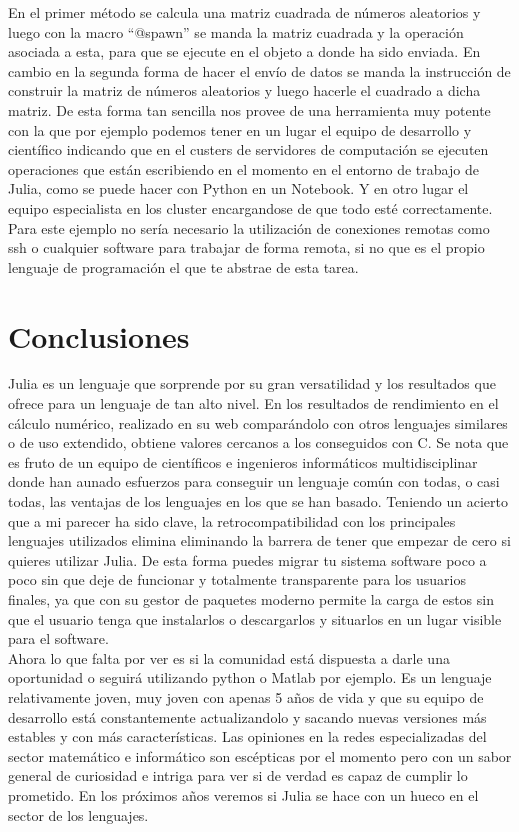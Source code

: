 \documentclass[10pt,a4paper]{article}
\begin{document}
En el primer método se calcula una matriz cuadrada de números aleatorios y luego con la macro ``@spawn'' se manda la matriz cuadrada y la operación asociada a esta, para que se ejecute en el objeto a donde ha sido enviada. En cambio en la segunda forma de hacer el envío de datos se manda la instrucción de construir la matriz de números aleatorios y luego hacerle el cuadrado a dicha matriz. De esta forma tan sencilla nos provee de una herramienta muy potente con la que por ejemplo podemos tener en un lugar el equipo de desarrollo y científico indicando que en el custers de servidores de computación se ejecuten operaciones que están escribiendo en el momento en el entorno de trabajo de Julia, como se puede hacer con Python en un Notebook. Y en otro lugar el equipo especialista en los cluster encargandose de que todo esté correctamente. Para este ejemplo no sería necesario la utilización de conexiones remotas como ssh o cualquier software para trabajar de forma remota, si no que es el propio lenguaje de programación el que te abstrae de esta tarea.

\newpage
\section{Conclusiones}
Julia es un lenguaje que sorprende por su gran versatilidad y los resultados que ofrece para un lenguaje de tan alto nivel. En los resultados de rendimiento en el cálculo numérico, realizado en su web comparándolo con otros lenguajes similares o de uso extendido, obtiene valores cercanos a los conseguidos con C. Se nota que es fruto de un equipo de científicos e ingenieros informáticos multidisciplinar donde han aunado esfuerzos para conseguir un lenguaje común con todas, o casi todas, las ventajas de los lenguajes en los que se han basado. Teniendo un acierto que a mi parecer ha sido clave, la retrocompatibilidad con los principales lenguajes utilizados elimina eliminando la barrera de tener que empezar de cero si quieres utilizar Julia. De esta forma puedes migrar tu sistema software poco a poco sin que deje de funcionar y totalmente transparente para los usuarios finales, ya que con su gestor de paquetes moderno permite la carga de estos sin que el usuario tenga que instalarlos o descargarlos y situarlos en un lugar visible para el software.\\

Ahora lo que falta por ver es si la comunidad está dispuesta a darle una oportunidad o seguirá utilizando python o Matlab por ejemplo. Es un lenguaje relativamente joven, muy joven con apenas 5 años de vida y que su equipo de desarrollo está constantemente actualizandolo y sacando nuevas versiones más estables y con más características. Las opiniones en la redes especializadas del sector matemático e informático son escépticas por el momento pero con un sabor general de curiosidad e intriga para ver si de verdad es capaz de cumplir lo prometido. En los próximos años veremos si Julia se hace con un hueco en el sector de los lenguajes.
\end{document}

